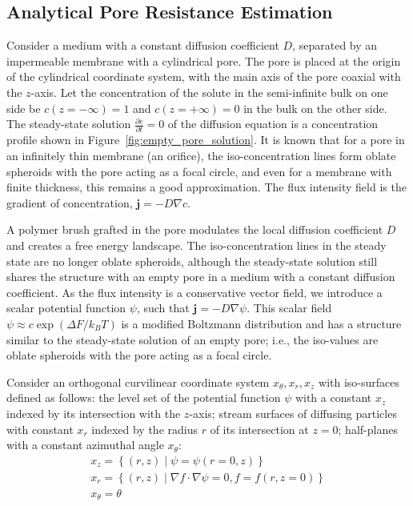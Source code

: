 \documentclass[10pt, a4paper]{article}
\begin{document}
\subsection*{Analytical Pore Resistance Estimation}
\begin{multicols}{2}



Consider a medium with a constant diffusion coefficient $D$, separated by an impermeable membrane with a cylindrical pore.
The pore is placed at the origin of the cylindrical coordinate system, with the main axis of the pore coaxial with the $z$-axis.
Let the concentration of the solute in the semi-infinite bulk on one side be $c(z = -\infty) = 1$ and $c(z = +\infty) = 0$ in the bulk on the other side.
The steady-state solution $\frac{\partial c}{\partial t} = 0$ of the diffusion equation is a concentration profile shown in Figure~\ref{fig:empty_pore_solution}.
It is known that for a pore in an infinitely thin membrane (an orifice), the iso-concentration lines form oblate spheroids with the pore acting as a focal circle, and even for a membrane with finite thickness, this remains a good approximation.
The flux intensity field is the gradient of concentration, $\mathbf{j} = -D \nabla c$.

A polymer brush grafted in the pore modulates the local diffusion coefficient $D$ and creates a free energy landscape.
The iso-concentration lines in the steady state are no longer oblate spheroids, although the steady-state solution still shares the structure with an empty pore in a medium with a constant diffusion coefficient.
As the flux intensity is a conservative vector field, we introduce a scalar potential function $\psi$, such that $\mathbf{j} = -D \nabla \psi$.
This scalar field $\psi \approx c \exp(\Delta F / k_B T)$ is a modified Boltzmann distribution and has a structure similar to the steady-state solution of an empty pore; i.e., the iso-values are oblate spheroids with the pore acting as a focal circle.

Consider an orthogonal curvilinear coordinate system $x_{\theta}, x_{r}, x_{z}$ with iso-surfaces defined as follows:
the level set of the potential function $\psi$ with a constant $x_{z}$ indexed by its intersection with the $z$-axis;
stream surfaces of diffusing particles with constant $x_{r}$ indexed by the radius $r$ of its intersection at $z = 0$;
half-planes with a constant azimuthal angle $x_{\theta}$:
\begin{gather}
    x_z = \left\{ (r, z) \mid \psi = \psi(r = 0, z) \right\}
    \\
    x_r = \left\{ (r, z) \mid \nabla f \cdot \nabla \psi = 0, f = f(r, z = 0) \right\}
    \\
    x_{\theta} = \theta
\end{gather}


\end{multicols}
\end{document}
